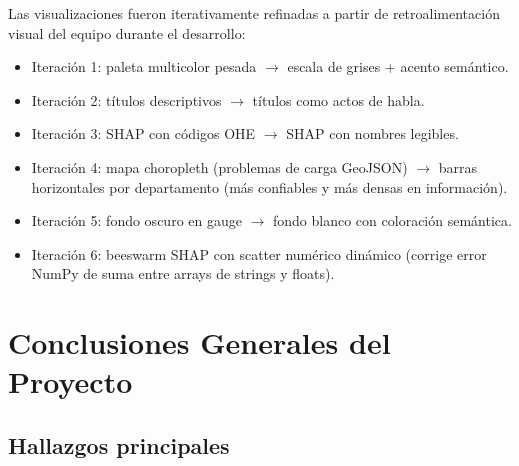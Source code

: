 \documentclass[12pt, a4paper]{article}
\begin{document}
Las visualizaciones fueron iterativamente refinadas a partir de retroalimentación
visual del equipo durante el desarrollo:

\begin{itemize}[noitemsep]
  \item Iteración 1: paleta multicolor pesada $\to$ escala de grises + acento semántico.
  \item Iteración 2: títulos descriptivos $\to$ títulos como actos de habla.
  \item Iteración 3: SHAP con códigos OHE $\to$ SHAP con nombres legibles.
  \item Iteración 4: mapa choropleth (problemas de carga GeoJSON) $\to$ barras horizontales
  por departamento (más confiables y más densas en información).
  \item Iteración 5: fondo oscuro en gauge $\to$ fondo blanco con coloración semántica.
  \item Iteración 6: beeswarm SHAP con scatter numérico dinámico (corrige error NumPy
  de suma entre arrays de strings y floats).
\end{itemize}

\section{Conclusiones Generales del Proyecto}
\label{sec:conclusiones}

\subsection{Hallazgos principales}
\end{document}
